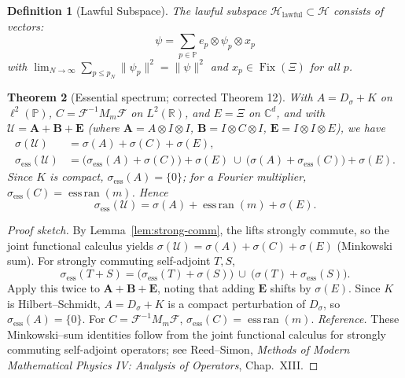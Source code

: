 \documentclass[10pt]{article}
\newtheorem{theorem}{Theorem}
\newtheorem{definition}[theorem]{Definition}
\DeclareMathOperator{\Fix}{Fix}
\DeclareMathOperator{\EssRan}{ess\,ran}
\newcommand{\PP}{\mathbb{P}}
\newcommand{\RR}{\mathbb{R}}
\newcommand{\CC}{\mathbb{C}}
\newcommand{\HH}{\mathcal{H}}
\begin{document}
\begin{definition}[Lawful Subspace]
The lawful subspace $\HH_{\text{lawful}} \subset \HH$ consists of vectors:
\[
\psi = \sum_{p \in \PP} e_p \otimes \psi_p \otimes x_p
\]
with $\lim_{N\to\infty} \sum_{p \leq p_N} \|\psi_p\|^2 = \|\psi\|^2$ and $x_p \in \Fix(\Xi)$ for all $p$.
\end{definition}


\begin{theorem}[Essential spectrum; corrected Theorem 12]\label{thm:ess-12}
With $A=D_\sigma+K$ on $\ell^2(\PP)$, $C=\mathcal F^{-1} M_m \mathcal F$ on $L^2(\RR)$,
and $E=\Xi$ on $\CC^d$, and with $\mathcal U=\mathbf A+\mathbf B+\mathbf E$
(where $\mathbf A=A\otimes I\otimes I$, $\mathbf B=I\otimes C\otimes I$, $\mathbf E=I\otimes I\otimes E$), we have
\begin{align*}
\sigma(\mathcal U) &= \sigma(A)+\sigma(C)+\sigma(E),\\
\sigma_{\mathrm{ess}}(\mathcal U)
&= \big(\sigma_{\mathrm{ess}}(A)+\sigma(C)\big)+\sigma(E)\ \cup\
\big(\sigma(A)+\sigma_{\mathrm{ess}}(C)\big)+\sigma(E).
\end{align*}
Since $K$ is compact, $\sigma_{\mathrm{ess}}(A)=\{0\}$; for a Fourier multiplier, $\sigma_{\mathrm{ess}}(C)=\EssRan(m)$. Hence
\[
\sigma_{\mathrm{ess}}(\mathcal U)=\sigma(A)+\EssRan(m)+\sigma(E).
\]
\end{theorem}

\begin{proof}[Proof sketch]
By Lemma~\ref{lem:strong-comm}, the lifts strongly commute, so the joint functional calculus yields
$\sigma(\mathcal U)=\sigma(A)+\sigma(C)+\sigma(E)$ (Minkowski sum).
For strongly commuting self-adjoint $T,S$,
\[
\sigma_{\mathrm{ess}}(T+S)
=\big(\sigma_{\mathrm{ess}}(T)+\sigma(S)\big)\ \cup\ \big(\sigma(T)+\sigma_{\mathrm{ess}}(S)\big).
\]
Apply this twice to $\mathbf A+\mathbf B+\mathbf E$, noting that adding $\mathbf E$ shifts by $\sigma(E)$.
Since $K$ is Hilbert–Schmidt, $A=D_\sigma+K$ is a compact perturbation of $D_\sigma$, so
$\sigma_{\mathrm{ess}}(A)=\{0\}$. For $C=\mathcal F^{-1}M_m\mathcal F$, $\sigma_{\mathrm{ess}}(C)=\EssRan(m)$.
\emph{Reference.} These Minkowski–sum identities follow from the joint functional calculus for
strongly commuting self-adjoint operators; see Reed–Simon,
\emph{Methods of Modern Mathematical Physics IV: Analysis of Operators}, Chap.~XIII.
\end{proof}
\end{document}
